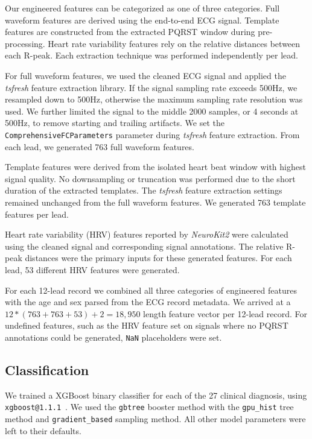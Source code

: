 \documentclass[twocolumn]{cinc}
\begin{document}
Our engineered features can be categorized as one of three categories.
Full waveform features are derived using the end-to-end ECG signal.
Template features are constructed from the extracted PQRST window during pre-processing.
Heart rate variability features rely on the relative distances between each R-peak.
Each extraction technique was performed independently per lead.

For full waveform features, we used the cleaned ECG signal and applied the \emph{tsfresh} feature extraction library.
If the signal sampling rate exceeds 500Hz, we resampled down to 500Hz, otherwise the maximum sampling rate resolution was used.
We further limited the signal to the middle 2000 samples, or 4 seconds at 500Hz, to remove starting and trailing artifacts.
We set the \texttt{ComprehensiveFCParameters} parameter during \emph{tsfresh} feature extraction.
From each lead, we generated 763 full waveform features.

Template features were derived from the isolated heart beat window with highest signal quality.
No downsampling or truncation was performed due to the short duration of the extracted templates.
The \emph{tsfresh} feature extraction settings remained unchanged from the full waveform features.
We generated 763 template features per lead.

Heart rate variability (HRV) features reported by \emph{NeuroKit2} were calculated using the cleaned signal and corresponding signal annotations.
The relative R-peak distances were the primary inputs for these generated features.
For each lead, 53 different HRV features were generated.

For each 12-lead record we combined all three categories of engineered features with the age and sex parsed from the ECG record metadata.
We arrived at a $12 * (763 + 763 + 53) + 2 = 18,950$ length feature vector per 12-lead record.
For undefined features, such as the HRV feature set on signals where no PQRST annotations could be generated, \texttt{NaN} placeholders were set.

\subsection{Classification}

We trained a XGBoost binary classifier for each of the 27 clinical diagnosis, using \texttt{xgboost@1.1.1}~\cite{chen_xgboost_2016}.
We used the \texttt{gbtree} booster method with the \texttt{gpu\_hist} tree method and \texttt{gradient\_based} sampling method.
All other model parameters were left to their defaults.
\end{document}
